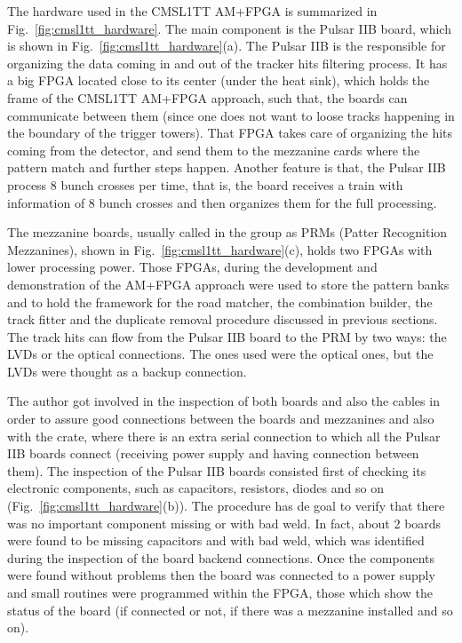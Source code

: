 The hardware used in the CMSL1TT AM+FPGA is summarized in Fig.~\ref{fig:cmsl1tt_hardware}. The main component is the Pulsar IIB board, which is shown in Fig.~\ref{fig:cmsl1tt_hardware}(a). The Pulsar IIB is the responsible for organizing the data coming in and out of the tracker hits filtering process. It has a big FPGA located close to its center (under the heat sink), which holds the frame of the CMSL1TT AM+FPGA approach, such that, the boards can communicate between them (since one does not want to loose tracks happening in the boundary of the trigger towers). That FPGA takes care of organizing the hits coming from the detector, and send them to the mezzanine cards where the pattern match and further steps happen. Another feature is that, the Pulsar IIB process 8 bunch crosses per time, that is, the board receives a train with information of 8 bunch crosses and then organizes them for the full processing.

The mezzanine boards, usually called in the group as PRMs (Patter Recognition Mezzanines), shown in Fig.~\ref{fig:cmsl1tt_hardware}(c), holds two FPGAs with lower processing power. Those FPGAs, during the development and demonstration of the AM+FPGA approach were used to store the pattern banks and to hold the framework for the road matcher, the combination builder, the track fitter and the duplicate removal procedure discussed in previous sections. The track hits can flow from the Pulsar IIB board to the PRM by two ways: the LVDs or the optical connections. The ones used were the optical ones, but the LVDs were thought as a backup connection.

The author got involved in the inspection of both boards and also the cables in order to assure good connections between the boards and mezzanines and also with the crate, where there is an extra serial connection to which all the Pulsar IIB boards connect (receiving power supply and having connection between them). The inspection of the Pulsar IIB boards consisted first of checking its electronic components, such as capacitors, resistors, diodes and so on (Fig.~\ref{fig:cmsl1tt_hardware}(b)). The procedure has de goal to verify that there was no important component missing or with bad weld. In fact, about 2 boards were found to be missing capacitors and with bad weld, which was identified during the inspection of the board backend connections. Once the components were found without problems then the board was connected to a power supply and small routines were programmed within the FPGA, those which show the status of the board (if connected or not, if there was a mezzanine installed and so on).

